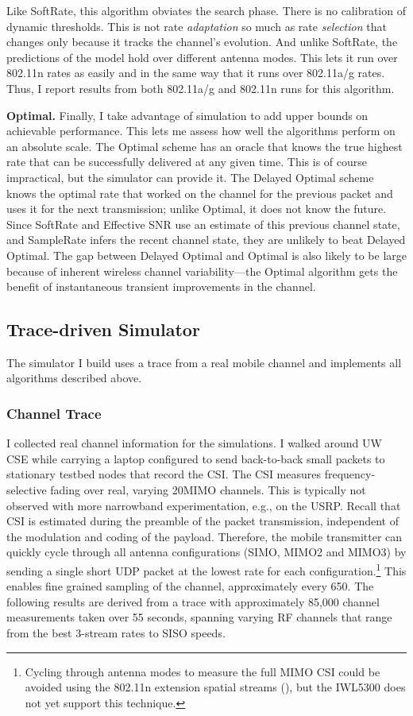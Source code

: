 Like SoftRate, this algorithm obviates the search phase. There is no calibration of dynamic thresholds. This is not rate \emph{adaptation} so much as rate \emph{selection} that changes only because it tracks the channel's evolution. And unlike SoftRate, the predictions of the model hold over different antenna modes. This lets it run over 802.11n rates as easily and in the same way that it runs over 802.11a/g rates. Thus, I report results from both 802.11a/g and 802.11n runs for this algorithm.

\textbf{Optimal.} Finally, I take advantage of simulation to add upper bounds on achievable performance. This lets me assess how well the algorithms perform on an absolute scale. The Optimal scheme has an oracle that knows the true highest rate that can be successfully delivered at any given time. This is of course impractical, but the simulator can provide it. The Delayed Optimal scheme knows the optimal rate that worked on the channel for the previous packet and uses it for the next transmission; unlike Optimal, it does not know the future. Since SoftRate and Effective SNR use an estimate of this previous channel state, and SampleRate infers the recent channel state, they are unlikely to beat Delayed Optimal. The gap between Delayed Optimal and Optimal is also likely to be large because of inherent wireless channel variability---the Optimal algorithm gets the benefit of instantaneous transient improvements in the channel.

\subsection{Trace-driven Simulator}

The simulator I build uses a trace from a real mobile channel and implements all algorithms described above.

\subsubsection{Channel Trace}
I collected real channel information for the simulations. I walked around UW CSE while carrying a laptop configured to send back-to-back small packets to stationary testbed nodes that record the CSI. The CSI measures frequency-selective fading over real, varying 20\MHz MIMO channels. This is typically not observed with more narrowband experimentation, e.g., on the USRP. Recall that CSI is estimated during the preamble of the packet transmission, independent of the modulation and coding of the payload. Therefore, the mobile transmitter can quickly cycle through all antenna configurations (SIMO, MIMO2 and MIMO3) by sending a single short UDP packet at the lowest rate for each configuration.\footnote{Cycling through antenna modes to measure the full MIMO CSI could be avoided using the 802.11n extension spatial streams (), but the IWL5300 does not yet support this technique.} This enables fine grained sampling of the channel, approximately every 650\us. The following results are derived from a trace with approximately 85,000 channel measurements taken over 55 seconds, spanning varying RF channels that range from the best 3-stream rates to SISO speeds.

